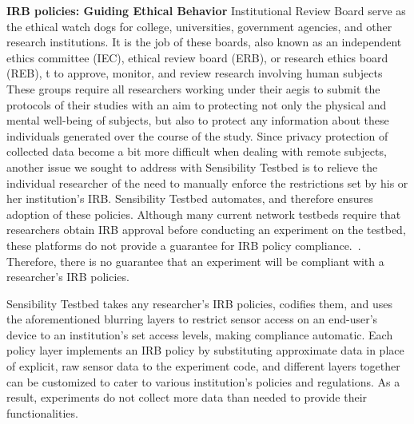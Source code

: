{\textbf{IRB policies: Guiding Ethical Behavior}
Institutional Review Board serve as the ethical watch dogs for college, universities, government agencies, and other research institutions. It is the job of these boards, also known as an independent ethics committee (IEC), ethical 
review board (ERB), or research ethics board (REB), 
t to approve, monitor, and review 
research involving human subjects~\cite{irb} These groups require all researchers working under their aegis to submit the protocols of their studies with an aim to protecting not only the physical and mental well-being of subjects, but also to protect any information about these individuals generated over the course of the study. Since privacy protection of collected data become a bit more difficult when dealing with remote subjects, another issue we sought to address with Sensibility Testbed is to 
relieve the individual researcher of the need to manually enforce 
the restrictions set by his or her institution's IRB.
Sensibility Testbed automates, and therefore ensures adoption of these policies. Although many current network 
testbeds require that researchers obtain IRB approval before conducting
an experiment on the testbed, these platforms do not provide a guarantee 
for IRB policy compliance.~\cite{nandugudi2013phonelab, nikravesh2015mobilyzer}. 
Therefore, there is no guarantee that an 
experiment will be compliant with a researcher's IRB policies.

Sensibility Testbed takes any researcher's IRB policies, codifies them, and uses the aforementioned blurring layers 
 to restrict sensor access on an end-user's device to 
an institution's set access levels, making compliance automatic. 
Each policy layer implements an IRB policy by substituting 
approximate data in place of explicit, raw sensor data to the experiment code, and different layers 
together can be customized to cater to various institution's 
policies and regulations. As a result, experiments 
do not collect more data than needed to provide their functionalities.


}
